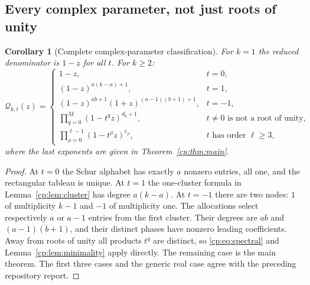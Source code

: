 \documentclass[11pt]{article}
\newtheorem{corollary}[theorem]{Corollary}
\theoremstyle{definition}
\theoremstyle{remark}
\newcommand{\Q}{\mathbb Q}
\newcommand{\QQ}{\mathscr Q}
\theoremstyle{definition}
\theoremstyle{plain}
\numberwithin{equation}{section}
\begin{document}
\subsection{Every complex parameter, not just roots of unity}
\begin{corollary}[Complete complex-parameter classification]
\label{cp:cor:complex}
For $k=1$ the reduced denominator is $1-z$ for all $t$. For $k\ge2$:
\begin{equation}
 \QQ_{k,t}(z)=
 \begin{cases}
 1-z,&t=0,\\
 (1-z)^{a(k-a)+1},&t=1,\\
 (1-z)^{ab+1}(1+z)^{(a-1)(b+1)+1},&t=-1,\\
 \displaystyle\prod_{q=0}^{M}(1-t^qz)^{d_q+1},
       &t\ne0\text{ is not a root of unity},\\
 \displaystyle\prod_{\rho=0}^{\ell-1}(1-t^\rho z)^{e_\rho},
       &t\text{ has order }\ell\ge3,
 \end{cases}
 \label{cp:eq:allcomplex}
\end{equation}
where the last exponents are given in Theorem~\ref{cp:thm:main}.
\end{corollary}
\begin{proof}
At $t=0$ the Schur alphabet has exactly $a$ nonzero entries, all one,
and the rectangular tableau is unique. At $t=1$ the one-cluster formula
in Lemma~\ref{cp:lem:cluster} has degree $a(k-a)$.
At $t=-1$ there are two nodes: $1$ of multiplicity $k-1$ and $-1$ of
multiplicity one. The allocations select respectively $a$ or $a-1$
entries from the first cluster. Their degrees are $ab$ and
$(a-1)(b+1)$, and their distinct phases have nonzero leading coefficients.
Away from roots of unity all products $t^q$ are distinct, so
\eqref{cp:eq:spectral} and Lemma~\ref{cp:lem:minimality} apply directly.
The remaining case is the main theorem. The first three cases and the
generic real case agree with the preceding repository report.
\end{proof}

\noindent[Added 30 September 2026, batch 66: the preceding repository report is Part~II;
the cases $t=0,\pm1$ are its Theorem~\ref{rs:thm:real}, and the generic
case is its Theorem~\ref{rs:thm:recurrence-main}, stated there over
$\Q(t)$ and at real $t\notin\{0,\pm1\}$. The line for complex $t$
that is not a root of unity extends that theorem to the complex plane.]
\end{document}
